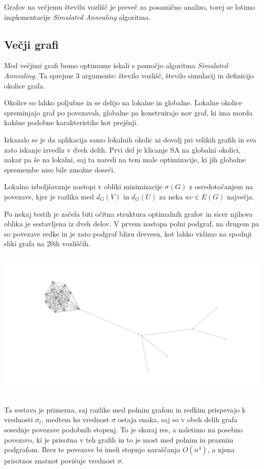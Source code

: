 \documentclass[ letterpaper, titlepage, fleqn]{article}
\begin{document}
Grafov na večjemu številu vozlišč je preveč za posamično analizo, torej
se lotimo implementacije {\em Simulated Annealing} algoritma.

\subsection{Večji grafi}

Med večjimi grafi bomo optimume iskali s pomočjo algoritma
{\em Simulated Annealing}. Ta sprejme 3 argumente: število vozlišč, število simulacij
in definicijo okolice grafa.

Okolice so lahko poljubne in se delijo na lokalne in globalne.
Lokalne okolice spreminjajo graf po povezavah, globalne pa
konstruirajo nov graf, ki ima morda kakšne podobne karakteristike kot prejšnji.

Izkazalo se je da aplikacija samo lokalnih okolic ni dovolj pri velikih grafih in sva zato
iskanje izvedla v dveh delih. Prvi del je klicanje SA na globalni okolici, nakar
pa še na lokalni, saj ta naredi na tem male optimizacije, ki jih globalne spremembe 
niso bile zmožne doseči.

Lokalno izboljšavanje nastopi v obliki minimizacije $\sigma(G)$ z osredotočanjem na
povezave, kjer je razlika med $d_G(V)$ in $d_G(U)$ za neka $uv \in E(G)$ največja.

Po nekaj testih je začela biti očitna struktura optimalnih grafov in sicer
njihova oblika je sestavljena iz dveh delov. V prvem nastopa polni podgraf, 
na drugem pa so povezave redke in je zato podgraf blizu drevesu, kot lahko 
vidimo na spodnji sliki grafa na 20ih vozliščih. \\
\includegraphics[width=\textwidth, height=8cm]{sample.png} \\
Ta sestava je primerna, saj razlike med polnim grafom in redkim prispevajo 
k vrednosti $\sigma_t$, medtem ko vrednost $\sigma$ ostaja enaka, saj so v obeh
delih grafa sosednje povezave podobnih stopenj. To je skoraj res, a naletimo na posebno povezavo,
ki je prisotna v teh grafih in to je most med polnim in praznim podgrafom. Brez te povezave
bi imeli stopnjo naraščanja $O(n^4)$, a njena prisotnos znatnot povišuje vrednost $\sigma$.
\end{document}
